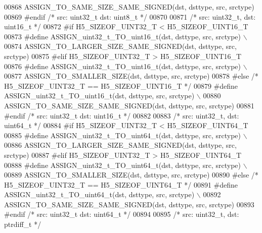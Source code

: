 \begin{DoxyCode}
00868 \textcolor{preprocessor}{        ASSIGN\_TO\_SAME\_SIZE\_SAME\_SIGNED(dst, dsttype, src, srctype)}
00869 \textcolor{preprocessor}{#endif }\textcolor{comment}{/* src: uint32\_t dst: uint8\_t */}\textcolor{preprocessor}{}
00870 
00871 \textcolor{comment}{/* src: uint32\_t, dst: uint16\_t */}
00872 \textcolor{preprocessor}{#if H5\_SIZEOF\_UINT32\_T < H5\_SIZEOF\_UINT16\_T}
00873 \textcolor{preprocessor}{    #define ASSIGN\_uint32\_t\_TO\_uint16\_t(dst, dsttype, src, srctype) \(\backslash\)}
00874 \textcolor{preprocessor}{        ASSIGN\_TO\_LARGER\_SIZE\_SAME\_SIGNED(dst, dsttype, src, srctype)}
00875 \textcolor{preprocessor}{#elif H5\_SIZEOF\_UINT32\_T > H5\_SIZEOF\_UINT16\_T}
00876 \textcolor{preprocessor}{    #define ASSIGN\_uint32\_t\_TO\_uint16\_t(dst, dsttype, src, srctype) \(\backslash\)}
00877 \textcolor{preprocessor}{        ASSIGN\_TO\_SMALLER\_SIZE(dst, dsttype, src, srctype)}
00878 \textcolor{preprocessor}{#else }\textcolor{comment}{/* H5\_SIZEOF\_UINT32\_T == H5\_SIZEOF\_UINT16\_T */}\textcolor{preprocessor}{}
00879 \textcolor{preprocessor}{    #define ASSIGN\_uint32\_t\_TO\_uint16\_t(dst, dsttype, src, srctype) \(\backslash\)}
00880 \textcolor{preprocessor}{        ASSIGN\_TO\_SAME\_SIZE\_SAME\_SIGNED(dst, dsttype, src, srctype)}
00881 \textcolor{preprocessor}{#endif }\textcolor{comment}{/* src: uint32\_t dst: uint16\_t */}\textcolor{preprocessor}{}
00882 
00883 \textcolor{comment}{/* src: uint32\_t, dst: uint64\_t */}
00884 \textcolor{preprocessor}{#if H5\_SIZEOF\_UINT32\_T < H5\_SIZEOF\_UINT64\_T}
00885 \textcolor{preprocessor}{    #define ASSIGN\_uint32\_t\_TO\_uint64\_t(dst, dsttype, src, srctype) \(\backslash\)}
00886 \textcolor{preprocessor}{        ASSIGN\_TO\_LARGER\_SIZE\_SAME\_SIGNED(dst, dsttype, src, srctype)}
00887 \textcolor{preprocessor}{#elif H5\_SIZEOF\_UINT32\_T > H5\_SIZEOF\_UINT64\_T}
00888 \textcolor{preprocessor}{    #define ASSIGN\_uint32\_t\_TO\_uint64\_t(dst, dsttype, src, srctype) \(\backslash\)}
00889 \textcolor{preprocessor}{        ASSIGN\_TO\_SMALLER\_SIZE(dst, dsttype, src, srctype)}
00890 \textcolor{preprocessor}{#else }\textcolor{comment}{/* H5\_SIZEOF\_UINT32\_T == H5\_SIZEOF\_UINT64\_T */}\textcolor{preprocessor}{}
00891 \textcolor{preprocessor}{    #define ASSIGN\_uint32\_t\_TO\_uint64\_t(dst, dsttype, src, srctype) \(\backslash\)}
00892 \textcolor{preprocessor}{        ASSIGN\_TO\_SAME\_SIZE\_SAME\_SIGNED(dst, dsttype, src, srctype)}
00893 \textcolor{preprocessor}{#endif }\textcolor{comment}{/* src: uint32\_t dst: uint64\_t */}\textcolor{preprocessor}{}
00894 
00895 \textcolor{comment}{/* src: uint32\_t, dst: ptrdiff\_t */}

\end{DoxyCode}
